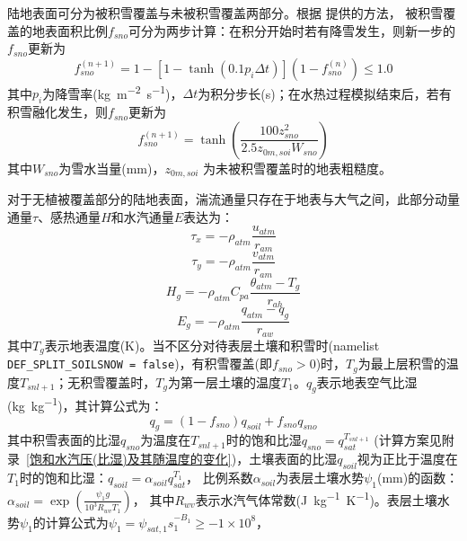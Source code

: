 陆地表面可分为被积雪覆盖与未被积雪覆盖两部分。根据 \citet{swenson2012new}提供的方法，
被积雪覆盖的地表面积比例$f_{sno}$可分为两步计算：在积分开始时若有降雪发生，则新一步的$f_{sno}$更新为
\begin{equation}
f_{{sno }}^{(n+1)}=1-\left[1-\tanh\left(0.1 p_{i} \Delta t\right)\right]\left(1-f_{{sno }}^{(n)}\right) \leqslant 1.0
\end{equation}
其中$p_i$为降雪率(\unit{kg.m^{-2}.s^{-1}})，$\Delta t$为积分步长(s)；在水热过程模拟结束后，若有积雪融化发生，则$f_{sno}$更新为
\begin{equation}
f_{sno}^{(n+1)}=\tanh{\left(\frac{100 z_{s n o}^{2}}{2.5 z_{0 m, s o i} W_{sno}}\right)}
\end{equation}
其中$W_{sno}$为雪水当量(mm)，$z_{0m,soi}$ 为未被积雪覆盖时的地表粗糙度。

对于无植被覆盖部分的陆地表面，湍流通量只存在于地表与大气之间，此部分动量通量$\tau$、感热通量$H$和水汽通量$E$表达为：
\begin{equation}\label{tau_x}
\tau_{x}=-\rho_{atm} \frac{u_{atm}}{r_{a m}}
\end{equation}
\begin{equation}\label{tau_y}
\tau_{y}=-\rho_{atm} \frac{v_{atm}}{r_{a m}}
\end{equation}
\begin{equation}\label{Hg}
H_{g}=-\rho_{atm} C_{pa} \frac{\theta_{atm}-T_{g}}{r_{a h}}
\end{equation}
\begin{equation}\label{Eg}
E_{g}=-\rho_{atm} \frac{q_{atm}-q_{g}}{r_{a w}}
\end{equation}
其中$T_g$表示地表温度(K)。当不区分对待表层土壤和积雪时(namelist \allowbreak \texttt{DEF\_SPLIT\_\allowbreak SOILSNOW \allowbreak = \allowbreak false})，有积雪覆盖(即$f_{sno}>0$)时，$T_g$为最上层积雪的温度$T_{snl+1}$；无积雪覆盖时，$T_g$为第一层土壤的温度$T_1$。$q_g$表示地表空气比湿(\unit{kg.kg^{-1}})，其计算公式为：
\begin{equation}\label{qg}
q_{g}=\left(1-f_{{sno }}\right) q_{{soil }}+f_{{sno }} q_{{sno }}
\end{equation}
其中积雪表面的比湿$q_{sno}$为温度在$T_{snl+1}$时的饱和比湿$q_{sno}=q_{sat}^{T_{snl+1}}$
(计算方案见附录~\ref{饱和水汽压(比湿)及其随温度的变化})，土壤表面的比湿$q_{soil}$视为正比于温度在$T_1$时的饱和比湿：$q_{soil}=\alpha_{soil}q_{sat}^{T_1}$，
比例系数$\alpha_{soil}$为表层土壤水势$\psi_1$(mm)的函数\citep{philip1957theory}：$\alpha_{soil}=\exp \left(\frac{\psi_1g}{{10}^3R_{wv}T_1}\right)$，
其中$R_{wv}$表示水汽气体常数(\unit{J.kg^{-1}.K^{-1}})。表层土壤水势$\psi_1$的计算公式为$\psi_1=\psi_{sat,1}s_1^{-B_1}\geq-1\times{10}^8$，
